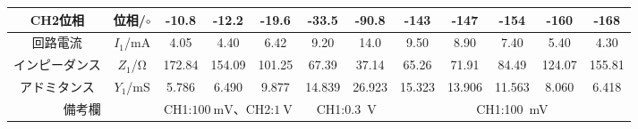 \documentclass[12pt,a4paper]{jsarticle}
\numberwithin{equation}{section}
\numberwithin{figure}{section}
\numberwithin{table}{section}
\begin{document}
\begin{table}[h]
\begin{center}
{\begin{tabular}{|c|c|ccc|cc|ccccc|}
              CH2位相&位相/$\circ$                  &        -10.8          &       -12.2       &          -19.6           &        -33.5             &          -90.8          &           -143            &         -147         &         -154         &           -160          &         -168          \\
              \hline
              回路電流      &$I_1$/\si{\milli\ampere} &         4.05           &        4.40        &          6.42           &          9.20           &          14.0           &          9.50             &        8.90         &          7.40        &            5.40         &         4.30          \\
              インピーダンス&$Z_1$/\si{\ohm}          &       172.84          &      154.09     &         101.25         &        67.39          &          37.14         &           65.26         &        71.91        &        84.49      &         124.07        &           155.81      \\
              アドミタンス  &$Y_1$/\si{\milli\siemens}&        5.786          &       6.490        &          9.877          &        14.839            &         26.923          &          15.323            &      13.906         &        11.563         &         8.060          &          6.418       \\
              \hline
              \multicolumn{2}{|c|}{備考欄}          & \multicolumn{3}{c|}{CH1:$\SI{100}{\milli\volt}$、CH2:$\SI{1}{\volt}$}&\multicolumn{2}{c|}{CH1:\SI{0.3}{\volt}}&\multicolumn{5}{c|}{CH1:\SI{100}{\milli\volt}}\\
              \hline
          \end{tabular}
        }
      \end{center}
      \end{table}
\end{document}
